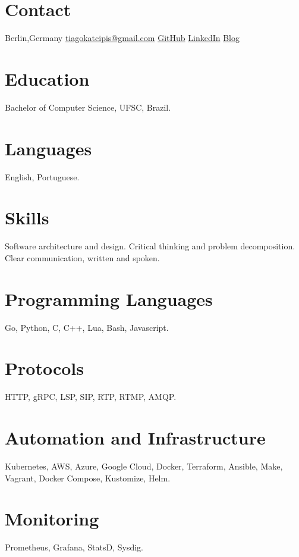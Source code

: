 \documentclass[]{friggeri-cv} %
\begin{document}


\begin{aside} %
\section{Contact}
Berlin,Germany
\href{mailto:tiagokatcipis@gmail.com}{tiagokatcipis@gmail.com}
\href{https://github.com/katcipis}{GitHub}
\href{http://www.linkedin.com/pub/tiago-katcipis/1b/273/8b0}{LinkedIn}
\href{http://katcipis.github.io/}{Blog}
\section{Education}
Bachelor of Computer Science, UFSC, Brazil.
\section{Languages}
English, Portuguese.
\section{Skills}
Software architecture and design.
Critical thinking and problem decomposition.
Clear communication, written and spoken.
\section{Programming Languages}
Go, Python, C, C++, Lua, Bash, Javascript.
\section{Protocols}
HTTP, gRPC, LSP, SIP, RTP, RTMP, AMQP.
\section{Automation and Infrastructure}
Kubernetes, AWS, Azure, Google Cloud, Docker, Terraform,
Ansible, Make, Vagrant, Docker Compose, Kustomize, Helm.
\section{Monitoring}
Prometheus, Grafana, StatsD, Sysdig.
\end{aside}
\end{document}
